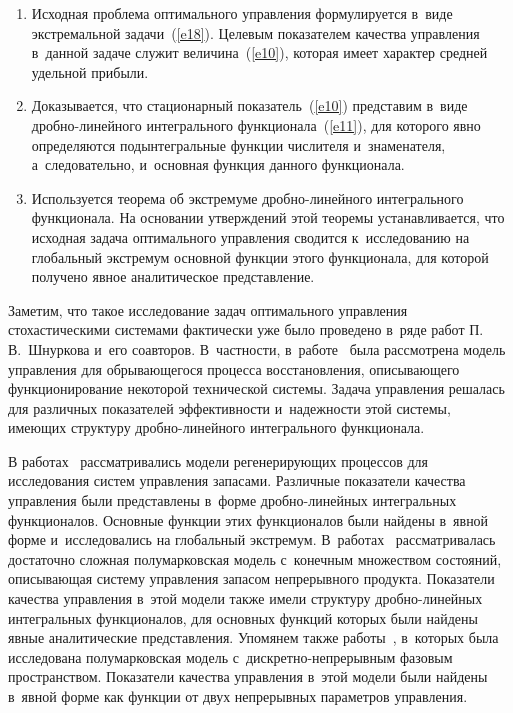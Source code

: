 \begin{multicols}{2}
\begin{enumerate}[1.]
\item Исходная проблема оптимального управления формулируется в~виде 
экстремальной задачи~(\ref{e18}). Целевым показателем качества управ\-ле\-ния в~данной задаче 
служит величина~(\ref{e10}), которая имеет характер средней удельной прибыли.
\item Доказывается, что стационарный показатель~(\ref{e10}) представим в~виде 
дроб\-но-ли\-ней\-но\-го интегрального функционала~(\ref{e11}), для которого явно 
определяются подынтегральные функции числителя и~знаменателя, а~следовательно, 
и~основная функция данного функционала.
\item Используется теорема об экстремуме дроб\-но-ли\-ней\-но\-го интегрального 
функционала. На основании утверждений этой теоремы уста\-нав\-ли\-ва\-ет\-ся, что 
исходная задача оптимального управления сводится к~исследованию на глобальный 
экстремум основной функции этого функционала, для которой получено явное 
аналитическое представление.
\end{enumerate}

Заметим, что такое исследование задач оптимального управления 
стохастическими системами фактически уже было проведено в~ряде работ П.\,В.~Шнуркова 
и~его соавторов. В~частности, в~работе~\cite{26} была рассмотрена модель 
управления для обрывающегося процесса восстановления, описывающего функционирование 
некоторой технической системы. Задача управления решалась для различных показателей 
эффективности и~надежности этой системы, имеющих структуру дроб\-но-ли\-ней\-но\-го 
интегрального функционала.

В работах~\cite{27, 28} рассматривались модели регенерирующих процессов 
для исследования сис\-тем управления запасами. Различные показатели качества 
управления были представлены в~форме дроб\-но-ли\-ней\-ных интегральных функционалов. 
Основные функции этих функционалов были найде\-ны в~явной форме и~исследовались 
на глобальный экстремум. В~работах~\cite{21,29} рассматривалась достаточно 
сложная полумарковская модель с~конечным множеством состояний, описывающая 
сис\-те\-му управления запасом непрерывного продукта. Показатели качества управления в~этой 
модели также имели структуру дроб\-но-ли\-ней\-ных интегральных функционалов, 
для основных функций которых были найдены явные аналитические представления. 
Упомянем также работы~\cite{30, 31}, в~которых была исследована полумарковская 
модель с~дис\-крет\-но-не\-пре\-рыв\-ным фазовым пространством. Показатели 
качества управления в~этой  модели были найдены в~явной форме как функции от 
двух непрерывных параметров управления.


\end{multicols}
